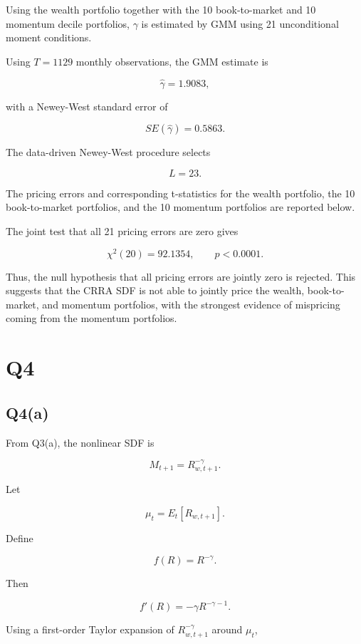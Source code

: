 \documentclass{article}
\begin{document}
Using the wealth portfolio together with the 10 book-to-market and 10 momentum decile portfolios, \(\gamma\) is estimated by GMM using 21 unconditional moment conditions.

Using \(T=1129\) monthly observations, the GMM estimate is

\[
\hat{\gamma}=1.9083,
\]

with a Newey-West standard error of

\[
SE(\hat{\gamma})=0.5863.
\]

The data-driven Newey-West procedure selects

\[
L=23.
\]

The pricing errors and corresponding t-statistics for the wealth portfolio, the 10 book-to-market portfolios, and the 10 momentum portfolios are reported below.



The joint test that all 21 pricing errors are zero gives

\[
\chi^2(20)=92.1354,
\qquad
p<0.0001.
\]

Thus, the null hypothesis that all pricing errors are jointly zero is rejected. This suggests that the CRRA SDF is not able to jointly price the wealth, book-to-market, and momentum portfolios, with the strongest evidence of mispricing coming from the momentum portfolios.


\newpage

\section{Q4}



\subsection{Q4(a)}

From Q3(a), the nonlinear SDF is

\[
M_{t+1}
=
R_{w,t+1}^{-\gamma}.
\]

Let

\[
\mu_t
=
E_t[R_{w,t+1}].
\]

Define

\[
f(R)
=
R^{-\gamma}.
\]

Then

\[
f'(R)
=
-\gamma R^{-\gamma-1}.
\]

Using a first-order Taylor expansion of \(R_{w,t+1}^{-\gamma}\) around \(\mu_t\),
\end{document}
